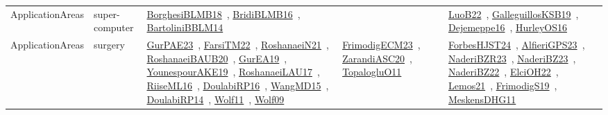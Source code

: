 {\begin{longtable}{lp{3cm}>{\raggedright\arraybackslash}p{6cm}>{\raggedright\arraybackslash}p{6cm}>{\raggedright\arraybackslash}p{8cm}}
\index{super-computer}\index{ApplicationAreas!super-computer}ApplicationAreas & super-computer & \href{../works/BorghesiBLMB18.pdf}{BorghesiBLMB18}~\cite{BorghesiBLMB18}, \href{../works/BridiBLMB16.pdf}{BridiBLMB16}~\cite{BridiBLMB16}, \href{../works/BartoliniBBLM14.pdf}{BartoliniBBLM14}~\cite{BartoliniBBLM14} &  & \href{../works/LuoB22.pdf}{LuoB22}~\cite{LuoB22}, \href{../works/GalleguillosKSB19.pdf}{GalleguillosKSB19}~\cite{GalleguillosKSB19}, \href{../works/Dejemeppe16.pdf}{Dejemeppe16}~\cite{Dejemeppe16}, \href{../works/HurleyOS16.pdf}{HurleyOS16}~\cite{HurleyOS16}\\
\index{surgery}\index{ApplicationAreas!surgery}ApplicationAreas & surgery & \href{../works/GurPAE23.pdf}{GurPAE23}~\cite{GurPAE23}, \href{../works/FarsiTM22.pdf}{FarsiTM22}~\cite{FarsiTM22}, \href{../works/RoshanaeiN21.pdf}{RoshanaeiN21}~\cite{RoshanaeiN21}, \href{../works/RoshanaeiBAUB20.pdf}{RoshanaeiBAUB20}~\cite{RoshanaeiBAUB20}, \href{../works/GurEA19.pdf}{GurEA19}~\cite{GurEA19}, \href{../works/YounespourAKE19.pdf}{YounespourAKE19}~\cite{YounespourAKE19}, \href{../works/RoshanaeiLAU17.pdf}{RoshanaeiLAU17}~\cite{RoshanaeiLAU17}, \href{../works/RiiseML16.pdf}{RiiseML16}~\cite{RiiseML16}, \href{../works/DoulabiRP16.pdf}{DoulabiRP16}~\cite{DoulabiRP16}, \href{../works/WangMD15.pdf}{WangMD15}~\cite{WangMD15}, \href{../works/DoulabiRP14.pdf}{DoulabiRP14}~\cite{DoulabiRP14}, \href{../works/Wolf11.pdf}{Wolf11}~\cite{Wolf11}, \href{../works/Wolf09.pdf}{Wolf09}~\cite{Wolf09} & \href{../works/FrimodigECM23.pdf}{FrimodigECM23}~\cite{FrimodigECM23}, \href{../works/ZarandiASC20.pdf}{ZarandiASC20}~\cite{ZarandiASC20}, \href{../works/TopalogluO11.pdf}{TopalogluO11}~\cite{TopalogluO11} & \href{../works/ForbesHJST24.pdf}{ForbesHJST24}~\cite{ForbesHJST24}, \href{../works/AlfieriGPS23.pdf}{AlfieriGPS23}~\cite{AlfieriGPS23}, \href{../works/NaderiBZR23.pdf}{NaderiBZR23}~\cite{NaderiBZR23}, \href{../works/NaderiBZ23.pdf}{NaderiBZ23}~\cite{NaderiBZ23}, \href{../works/NaderiBZ22.pdf}{NaderiBZ22}~\cite{NaderiBZ22}, \href{../works/ElciOH22.pdf}{ElciOH22}~\cite{ElciOH22}, \href{../works/Lemos21.pdf}{Lemos21}~\cite{Lemos21}, \href{../works/FrimodigS19.pdf}{FrimodigS19}~\cite{FrimodigS19}, \href{../works/MeskensDHG11.pdf}{MeskensDHG11}~\cite{MeskensDHG11}\\

\end{longtable}}
